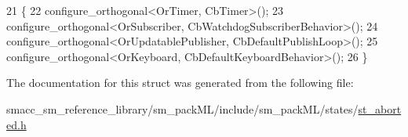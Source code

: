 \begin{DoxyCode}
21     \{
22         configure\_orthogonal<OrTimer, CbTimer>();   
23         configure\_orthogonal<OrSubscriber, CbWatchdogSubscriberBehavior>();
24         configure\_orthogonal<OrUpdatablePublisher, CbDefaultPublishLoop>();
25         configure\_orthogonal<OrKeyboard, CbDefaultKeyboardBehavior>();
26     \}
\end{DoxyCode}


The documentation for this struct was generated from the following file\+:\begin{DoxyCompactItemize}
\item 
smacc\+\_\+sm\+\_\+reference\+\_\+library/sm\+\_\+pack\+M\+L/include/sm\+\_\+pack\+M\+L/states/\hyperlink{st__aborted_8h}{st\+\_\+aborted.\+h}\end{DoxyCompactItemize}
